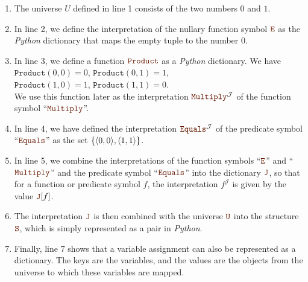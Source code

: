 \begin{enumerate}
\item The universe $U$ defined in line 1 consists of the two numbers $0$ and $1$.
      
\item In line 2, we define the interpretation of the nullary function symbol $\mytt{E}$
      as the \textsl{Python} dictionary that maps the empty tuple to the number $0$.
\item In line 3, we define a function $\mytt{Product}$ as a \textsl{Python} dictionary.  We have
      \\[0.2cm]
      \hspace*{1.3cm}
      $\mathtt{Product}(0,0) = 0$, \quad
      $\mathtt{Product}(0,1) = 1$, 
      \\[0.2cm]
      \hspace*{1.3cm}
      $\mathtt{Product}(1,0) = 1$, \quad
      $\mathtt{Product}(1,1) = 0$.
      \\[0.2cm]  
      We use this function later as the interpretation $\mytt{Multiply}^\mathcal{J}$ of the function symbol ``$\mytt{Multiply}$''.
\item In line 4, we have defined the interpretation $\mytt{Equals}^\mathcal{J}$ of
      the predicate symbol ``$\mytt{Equals}$'' as the set $\{ \pair(0,0), \pair(1,1)\}$.
\item In line 5, we combine the interpretations of the function symbols ``$\mytt{E}$'' and
      ``$\mytt{Multiply}$'' and the predicate symbol ``$\mytt{Equals}$'' into the dictionary $\mytt{J}$,
      so that for a function or predicate symbol $f$, the interpretation $f^\mathcal{J}$ is given by
      the value $\mytt{J}[f]$.
\item The interpretation $\mytt{J}$ is then combined with the
      universe $\mytt{U}$ into the structure $\mytt{S}$, which is simply represented as
      a pair in \textsl{Python}.
\item Finally, line 7 shows that a
      variable assignment can also be represented as a dictionary. The keys
      are the variables, and the values are the objects from the universe to which these variables
      are mapped.
\end{enumerate}



